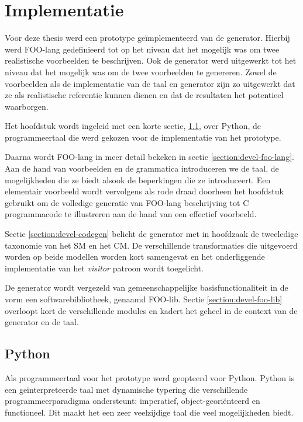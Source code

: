 
\chapter{Implementatie}
\label{chapter:implementatie}

Voor deze thesis werd een prototype ge\"implementeerd van de generator. Hierbij
werd FOO-lang gedefinieerd tot op het niveau dat het mogelijk was om twee
realistische voorbeelden te beschrijven. Ook de generator werd uitgewerkt tot
het niveau dat het mogelijk was om de twee voorbeelden te genereren. Zowel de
voorbeelden als de implementatie van de taal en generator zijn zo uitgewerkt
dat ze als realistische referentie kunnen dienen en dat de resultaten het
potentieel waarborgen.

Het hoofdstuk wordt ingeleid met een korte sectie, \ref{section:devel-python},
over Python, de programmeertaal die werd gekozen voor de implementatie van het
prototype.

Daarna wordt FOO-lang in meer detail bekeken in sectie
\ref{section:devel-foo-lang}. Aan de hand van voorbeelden en de grammatica
introduceren we de taal, de mogelijkheden die ze biedt alsook de beperkingen
die ze introduceert. Een elementair voorbeeld wordt vervolgens als rode draad
doorheen het hoofdstuk gebruikt om de volledige generatie van FOO-lang
beschrijving tot C programmacode te illustreren aan de hand van een effectief
voorbeeld.

Sectie \ref{section:devel-codegen} belicht de generator met in hoofdzaak de
tweeledige taxonomie van het SM en het CM. De verschillende transformaties die
uitgevoerd worden op beide modellen worden kort samengevat en het onderliggende
implementatie van het \emph{visitor} patroon \citep{gamma1994design} wordt
toegelicht.

De generator wordt vergezeld van gemeenschappelijke basisfunctionaliteit in de
vorm een softwarebibliotheek, genaamd FOO-lib. Sectie
\ref{section:devel-foo-lib} overloopt kort de verschillende modules en kadert
het geheel in de context van de generator en de taal.

\section{Python}
\label{section:devel-python}

Als programmeertaal voor het prototype werd geopteerd voor Python. Python is
een ge\"interpreteerde taal met dynamische typering die verschillende
programmeerparadigma ondersteunt: imperatief, object-geori\"enteerd en
functioneel. Dit maakt het een zeer veelzijdige taal die veel mogelijkheden
biedt.

